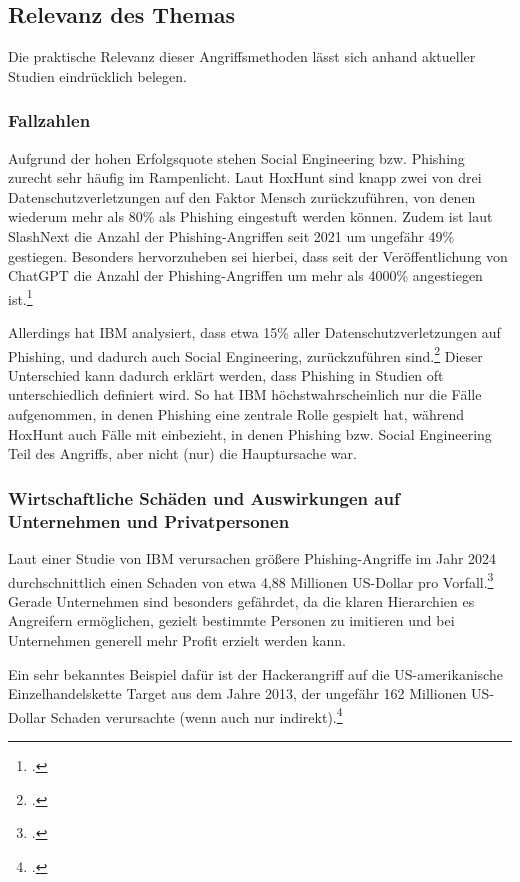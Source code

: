 \documentclass[12pt, a4paper, oneside]{scrartcl}
\begin{document}
\subsection{Relevanz des Themas}
Die praktische Relevanz dieser Angriffsmethoden lässt sich anhand aktueller Studien eindrücklich belegen.
\subsubsection{Fallzahlen}
Aufgrund der hohen Erfolgsquote stehen Social Engineering bzw. Phishing zurecht sehr häufig im Rampenlicht. 
Laut HoxHunt sind knapp zwei von drei 
Datenschutzverletzungen auf den Faktor Mensch zurückzuführen, von denen wiederum mehr als 80\%
als Phishing eingestuft werden können. Zudem ist laut SlashNext die Anzahl der Phishing-Angriffen
seit 2021 um ungefähr 49\% gestiegen. Besonders hervorzuheben sei hierbei, dass seit der Veröffentlichung
von ChatGPT die Anzahl der Phishing-Angriffen um mehr als 4000\% angestiegen ist.\footcite{HoxHunt_Report}
\par
Allerdings hat IBM analysiert, dass etwa 15\% aller Datenschutzverletzungen auf Phishing, und
dadurch auch Social Engineering, zurückzuführen sind.\footcite{IBM_Report}
Dieser Unterschied kann dadurch erklärt werden, dass Phishing in Studien oft unterschiedlich
definiert wird. So hat IBM höchstwahrscheinlich nur die Fälle aufgenommen, in denen 
Phishing eine zentrale Rolle gespielt hat, während HoxHunt auch Fälle mit einbezieht,
in denen Phishing bzw. Social Engineering Teil des Angriffs, aber nicht (nur) die Hauptursache war.

\subsubsection{Wirtschaftliche Schäden und Auswirkungen auf Unternehmen und Privatpersonen}
Laut einer Studie von IBM verursachen größere Phishing-Angriffe im Jahr 2024 durchschnittlich 
einen Schaden von etwa 4,88 Millionen US-Dollar pro Vorfall.\footcite{IBM_Phishing}
Gerade Unternehmen sind besonders gefährdet, da die klaren Hierarchien es Angreifern ermöglichen, 
gezielt bestimmte Personen zu imitieren und bei Unternehmen generell mehr Profit erzielt werden kann.
\par
Ein sehr bekanntes Beispiel dafür ist der Hackerangriff auf die US-amerikanische Einzelhandelskette Target 
aus dem Jahre 2013, der ungefähr 162 Millionen US-Dollar Schaden verursachte (wenn auch nur indirekt).\footcite{Target_Breach}\\
\end{document}
